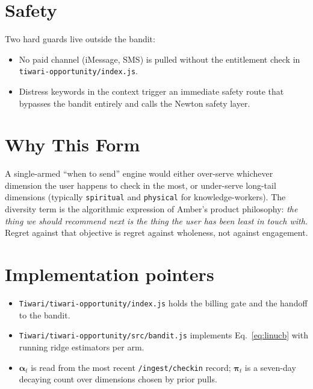 \documentclass[11pt]{article}
\begin{document}
\section{Safety}

Two hard guards live outside the bandit:

\begin{itemize}
\item No paid channel (iMessage, SMS) is pulled without the
      entitlement check in \texttt{tiwari-opportunity/index.js}.
\item Distress keywords in the context trigger an immediate safety
      route that bypasses the bandit entirely and calls the
      Newton safety layer.
\end{itemize}

\section{Why This Form}

A single-armed ``when to send'' engine would either over-serve
whichever dimension the user happens to check in the most, or
under-serve long-tail dimensions (typically \texttt{spiritual} and
\texttt{physical} for knowledge-workers). The diversity term is the
algorithmic expression of Amber's product philosophy: \emph{the thing
we should recommend next is the thing the user has been least in
touch with.} Regret against that objective is regret against
wholeness, not against engagement.

\section*{Implementation pointers}

\begin{itemize}
\item \texttt{Tiwari/tiwari-opportunity/index.js} holds the billing
      gate and the handoff to the bandit.
\item \texttt{Tiwari/tiwari-opportunity/src/bandit.js} implements
      Eq.~\ref{eq:linucb} with running ridge estimators per arm.
\item $\bm{\alpha}_t$ is read from the most recent
      \texttt{/ingest/checkin} record; $\bm{\pi}_t$ is a seven-day
      decaying count over dimensions chosen by prior pulls.
\end{itemize}
\end{document}
